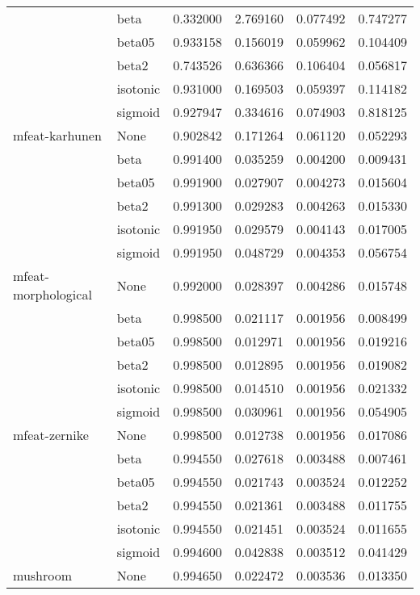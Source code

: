 \begin{tabular}{llrrrr}
        & beta &  0.332000 &  2.769160 &  0.077492 &  0.747277 \\
        & beta05 &  0.933158 &  0.156019 &  0.059962 &  0.104409 \\
        & beta2 &  0.743526 &  0.636366 &  0.106404 &  0.056817 \\
        & isotonic &  0.931000 &  0.169503 &  0.059397 &  0.114182 \\
        & sigmoid &  0.927947 &  0.334616 &  0.074903 &  0.818125 \\
mfeat-karhunen & None &  0.902842 &  0.171264 &  0.061120 &  0.052293 \\
        & beta &  0.991400 &  0.035259 &  0.004200 &  0.009431 \\
        & beta05 &  0.991900 &  0.027907 &  0.004273 &  0.015604 \\
        & beta2 &  0.991300 &  0.029283 &  0.004263 &  0.015330 \\
        & isotonic &  0.991950 &  0.029579 &  0.004143 &  0.017005 \\
        & sigmoid &  0.991950 &  0.048729 &  0.004353 &  0.056754 \\
mfeat-morphological & None &  0.992000 &  0.028397 &  0.004286 &  0.015748 \\
        & beta &  0.998500 &  0.021117 &  0.001956 &  0.008499 \\
        & beta05 &  0.998500 &  0.012971 &  0.001956 &  0.019216 \\
        & beta2 &  0.998500 &  0.012895 &  0.001956 &  0.019082 \\
        & isotonic &  0.998500 &  0.014510 &  0.001956 &  0.021332 \\
        & sigmoid &  0.998500 &  0.030961 &  0.001956 &  0.054905 \\
mfeat-zernike & None &  0.998500 &  0.012738 &  0.001956 &  0.017086 \\
        & beta &  0.994550 &  0.027618 &  0.003488 &  0.007461 \\
        & beta05 &  0.994550 &  0.021743 &  0.003524 &  0.012252 \\
        & beta2 &  0.994550 &  0.021361 &  0.003488 &  0.011755 \\
        & isotonic &  0.994550 &  0.021451 &  0.003524 &  0.011655 \\
        & sigmoid &  0.994600 &  0.042838 &  0.003512 &  0.041429 \\
mushroom & None &  0.994650 &  0.022472 &  0.003536 &  0.013350 \\

\end{tabular}
